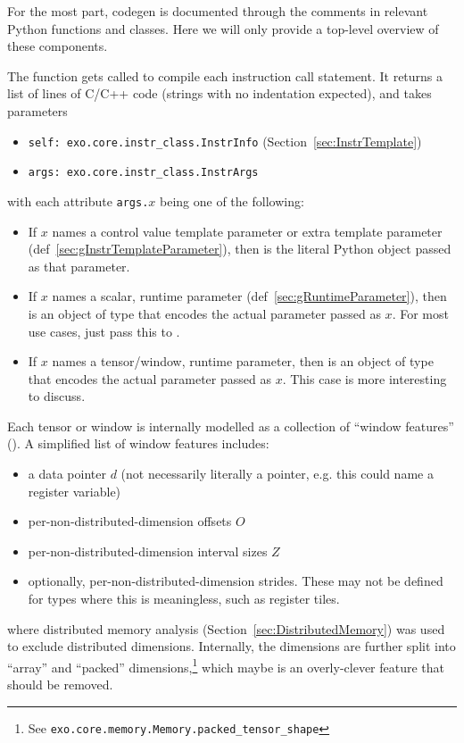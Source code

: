 
For the most part, codegen is documented through the comments in relevant Python functions and classes.
Here we will only provide a top-level overview of these components.

The  function gets called to compile each instruction call statement.
It returns a list of lines of C/C++ code (strings with no indentation expected), and takes parameters
\begin{itemize}
    \item \texttt{self: exo.core.instr\_class.InstrInfo} (Section~\ref{sec:InstrTemplate})
    \item \texttt{args: exo.core.instr\_class.InstrArgs}
\end{itemize}
with each attribute \texttt{args.$x$} being one of the following:
\begin{itemize}
  \item If $x$ names a control value template parameter or extra template parameter (def~\ref{sec:gInstrTemplateParameter}), then  is the literal Python object passed as that parameter.
  \item If $x$ names a scalar, runtime parameter (def~\ref{sec:gRuntimeParameter}), then  is an object of type  that encodes the actual parameter passed as $x$.
  For most use cases, just pass this to .
  \item If $x$ names a tensor/window, runtime parameter, then  is an object of type  that encodes the actual parameter passed as $x$.
  This case is more interesting to discuss.
\end{itemize}
Each tensor or window is internally modelled as a collection of ``window features''\\
().
A simplified list of window features includes:
\begin{itemize}
  \item a data pointer $d$ (not necessarily literally a pointer, e.g. this could name a register variable)
  \item per-non-distributed-dimension offsets $O$
  \item per-non-distributed-dimension interval sizes $Z$
  \item optionally, per-non-distributed-dimension strides.
    These may not be defined for  types where this is meaningless, such as register tiles.
\end{itemize}
where distributed memory analysis (Section~\ref{sec:DistributedMemory}) was used to exclude distributed dimensions.
Internally, the dimensions are further split into ``array'' and ``packed'' dimensions,\footnote{See \texttt{exo.core.memory.Memory.packed\_tensor\_shape}} which maybe is an overly-clever feature that should be removed.

